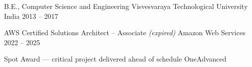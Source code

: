 \documentclass[11pt, a4paper]{awesome-cv}
\begin{document}
\begin{cventries}

  \cventry
    {B.E., Computer Science and Engineering}
    {Visvesvaraya Technological University}
    {India}
    {2013 -- 2017}
    {}

\end{cventries}

\begin{cventries}

  \cventry
    {AWS Certified Solutions Architect -- Associate \textnormal{\textit{(expired)}}}
    {Amazon Web Services}
    {}
    {2022 -- 2025}
    {}

  \cventry
    {Spot Award --- critical project delivered ahead of schedule}
    {OneAdvanced}
    {}
    {}
    {}

\end{cventries}

\begin{cvskills}
\end{cvskills}

\end{document}
